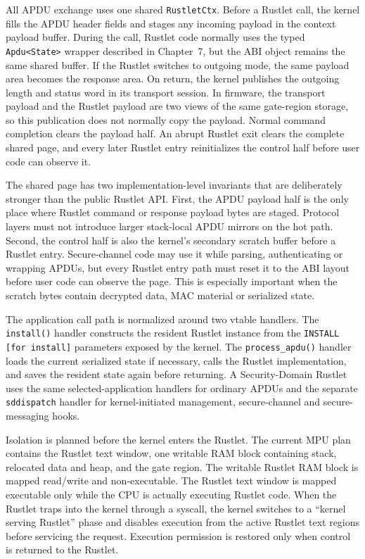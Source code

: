 All APDU exchange uses one shared \texttt{RustletCtx}. Before a Rustlet call,
the kernel fills the APDU header fields and stages any incoming payload in the
context payload buffer. During the call, Rustlet code normally uses the typed
\texttt{Apdu<State>} wrapper described in Chapter~7, but the ABI object remains
the same shared buffer. If the Rustlet switches to outgoing mode, the same
payload area becomes the response area. On return, the kernel publishes the
outgoing length and status word in its transport session. In firmware, the
transport payload and the Rustlet payload are two views of the same gate-region
storage, so this publication does not normally copy the payload. Normal command
completion clears the payload half. An abrupt Rustlet exit clears the complete
shared page, and every later Rustlet entry reinitializes the control half before
user code can observe it.

The shared page has two implementation-level invariants that are deliberately
stronger than the public Rustlet API. First, the APDU payload half is the only
place where Rustlet command or response payload bytes are staged. Protocol
layers must not introduce larger stack-local APDU mirrors on the hot path.
Second, the control half is also the kernel's secondary scratch buffer before a
Rustlet entry. Secure-channel code may use it while parsing, authenticating or
wrapping APDUs, but every Rustlet entry path must reset it to the ABI layout
before user code can observe the page. This is especially important when the
scratch bytes contain decrypted data, MAC material or serialized state.

The application call path is normalized around two vtable handlers. The
\texttt{install()} handler constructs the resident Rustlet instance from the
\texttt{INSTALL [for install]} parameters exposed by the kernel. The
\texttt{process\_apdu()} handler loads the current serialized state if
necessary, calls the Rustlet implementation, and saves the resident state again
before returning. A Security-Domain Rustlet uses the same selected-application
handlers for ordinary APDUs and the separate \texttt{sddispatch} handler for
kernel-initiated management, secure-channel and secure-messaging hooks.

Isolation is planned before the kernel enters the Rustlet. The current MPU plan
contains the Rustlet text window, one writable RAM block containing stack,
relocated data and heap, and the gate region. The writable Rustlet RAM block is
mapped read/write and non-executable. The Rustlet text window is mapped
executable only while the CPU is actually executing Rustlet code. When the
Rustlet traps into the kernel through a syscall, the kernel switches to a
``kernel serving Rustlet'' phase and disables execution from the active Rustlet
text regions before servicing the request. Execution permission is restored
only when control is returned to the Rustlet.

